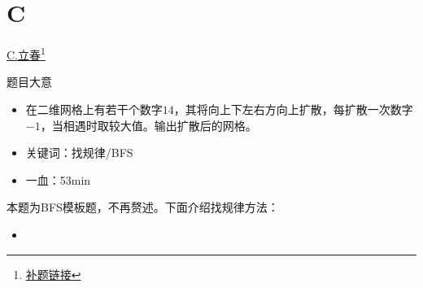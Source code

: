 \documentclass{beamer}
\begin{document}
    \section{C}
    \hypertarget{C}{}
    \begin{frame}{\hyperlink{toc}{C.立春}\footnote{\href{https://acm816.cn/p/238}{\underline{补题链接}}}}
        \begin{block}{题目大意}
            \begin{itemize}
                \item 在二维网格上有若干个数字$14$，其将向上下左右方向上扩散，每扩散一次数字$-1$，当相遇时取较大值。输出扩散后的网格。
                \item 关键词：找规律/BFS
                \item 一血：53min
            \end{itemize}
        \end{block}
        本题为BFS模板题，不再赘述。下面介绍找规律方法：
        \begin{itemize}
            \item 
        \end{itemize}
    \end{frame}
\end{document}
